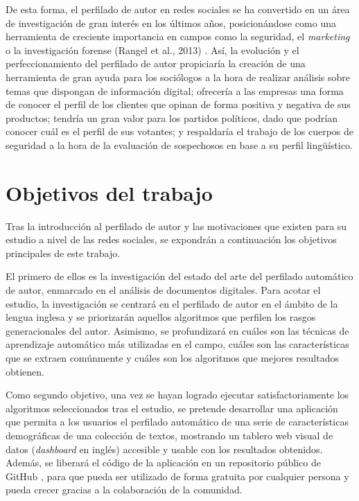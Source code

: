 \bigskip
De esta forma, el perfilado de autor en redes sociales se ha convertido en un área de investigación de gran interés
en los últimos años, posicionándose como una herramienta de creciente importancia en campos como la seguridad, el \textit{marketing}
o la investigación forense (Rangel et al., 2013) \cite{rangel2013overview}. Así, la evolución y el perfeccionamiento del perfilado de autor propiciaría la creación de
una herramienta de gran ayuda para los sociólogos a la hora de realizar análisis sobre temas que dispongan de información digital;
ofrecería a las empresas  una forma de conocer el perfil de los clientes que opinan de
forma positiva y negativa de sus productos; tendría un gran valor
para los partidos políticos, dado que podrían conocer cuál es el perfil de sus votantes; y respaldaría el trabajo de los cuerpos de seguridad
a la hora de la evaluación de sospechosos en base a su perfil lingüístico.

\section{Objetivos del trabajo}
\label{sec:intro_objetivos}

Tras la introducción al perfilado de autor y las motivaciones que existen para su estudio a nivel de las redes sociales,
se expondrán a continuación los objetivos principales de este trabajo.

\bigskip
El primero de ellos es la investigación del estado del arte del perfilado automático de autor, enmarcado en
el análisis de documentos digitales. Para acotar
el estudio, la investigación se centrará en el perfilado de autor en el ámbito de la lengua inglesa y se priorizarán
aquellos algoritmos que perfilen los rasgos generacionales del autor.
Asimismo, se profundizará en cuáles son las técnicas de aprendizaje automático más utilizadas en el campo,
cuáles son las características que se extraen comúnmente y cuáles son los algoritmos que mejores resultados obtienen.

\bigskip
Como segundo objetivo, una vez se hayan logrado ejecutar satisfactoriamente los algoritmos seleccionados tras el estudio,
se pretende desarrollar una aplicación que permita a los usuarios el perfilado automático de una serie de características
demográficas de una colección de textos, mostrando un tablero web visual de datos (\textit{dashboard} en inglés) accesible y usable con los resultados obtenidos.
Además, se liberará el código de la aplicación en un repositorio público de GitHub \cite{github}, para que pueda ser utilizado de forma
gratuita por cualquier persona y pueda crecer gracias a la colaboración de la comunidad.

